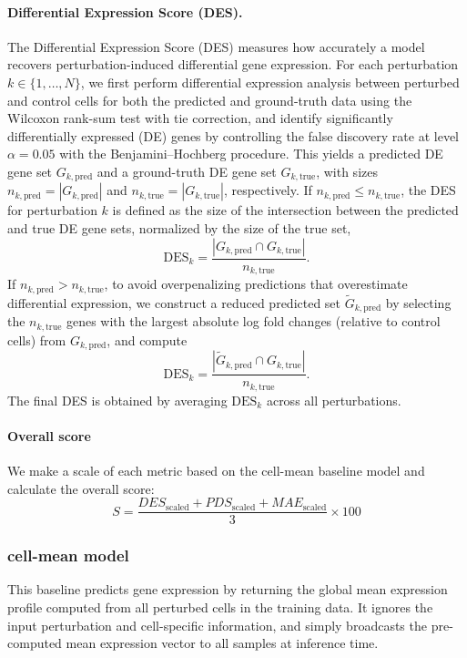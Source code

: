 \documentclass{article}
\begin{document}
\paragraph{Differential Expression Score (DES).}
The Differential Expression Score (DES) measures how accurately a model recovers perturbation-induced differential gene expression. For each perturbation $k \in \{1,\dots,N\}$, we first perform differential expression analysis between perturbed and control cells for both the predicted and ground-truth data using the Wilcoxon rank-sum test with tie correction, and identify significantly differentially expressed (DE) genes by controlling the false discovery rate at level $\alpha = 0.05$ with the Benjamini--Hochberg procedure. This yields a predicted DE gene set $G_{k,\mathrm{pred}}$ and a ground-truth DE gene set $G_{k,\mathrm{true}}$, with sizes $n_{k,\mathrm{pred}} = |G_{k,\mathrm{pred}}|$ and $n_{k,\mathrm{true}} = |G_{k,\mathrm{true}}|$, respectively. If $n_{k,\mathrm{pred}} \le n_{k,\mathrm{true}}$, the DES for perturbation $k$ is defined as the size of the intersection between the predicted and true DE gene sets, normalized by the size of the true set,
\[
\mathrm{DES}_k = \frac{|G_{k,\mathrm{pred}} \cap G_{k,\mathrm{true}}|}{n_{k,\mathrm{true}}}.
\]
If $n_{k,\mathrm{pred}} > n_{k,\mathrm{true}}$, to avoid overpenalizing predictions that overestimate differential expression, we construct a reduced predicted set $\tilde G_{k,\mathrm{pred}}$ by selecting the $n_{k,\mathrm{true}}$ genes with the largest absolute log fold changes (relative to control cells) from $G_{k,\mathrm{pred}}$, and compute
\[
\mathrm{DES}_k = \frac{|\tilde G_{k,\mathrm{pred}} \cap G_{k,\mathrm{true}}|}{n_{k,\mathrm{true}}}.
\]
The final DES is obtained by averaging $\mathrm{DES}_k$ across all perturbations.
\paragraph{Overall score}
We make a scale of each metric based on the cell-mean baseline model and calculate the overall score:
$$
S = \frac{DES_\text{scaled} + PDS_\text{scaled} + MAE_\text{scaled}}{3} \times 100
$$


\subsubsection{cell-mean model}
This baseline predicts gene expression by returning the global mean expression profile computed from all perturbed cells in the training data. It ignores the input perturbation and cell-specific information, and simply broadcasts the pre-computed mean expression vector to all samples at inference time.
\end{document}
